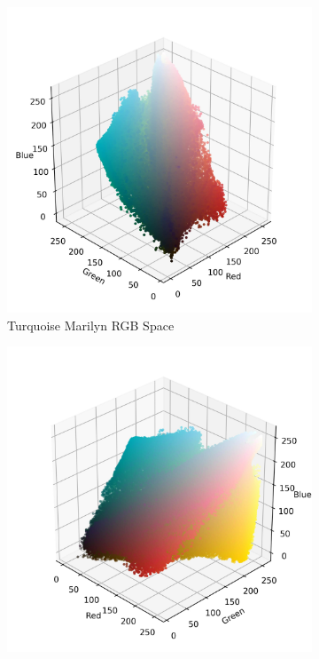 \documentclass{article}
\begin{document}
\begin{figure}[ht]\ContinuedFloat
  \centering
  \begin{subfigure}{0.45\textwidth}
    \includegraphics[width=\textwidth]{main_files/figure-latex/4_11_turq_marilyn_original_scatter.jpg}
    \caption{Turquoise Marilyn RGB Space}
    \label{fig:4_11_turq_marilyn_original_scatter}
  \end{subfigure}
  \hfill
  \begin{subfigure}{0.45\textwidth}
    \includegraphics[width=\textwidth]{main_files/figure-latex/4_12_turq_marilyn_original_scatter.jpg}

\end{subfigure}
\end{figure}
\end{document}
